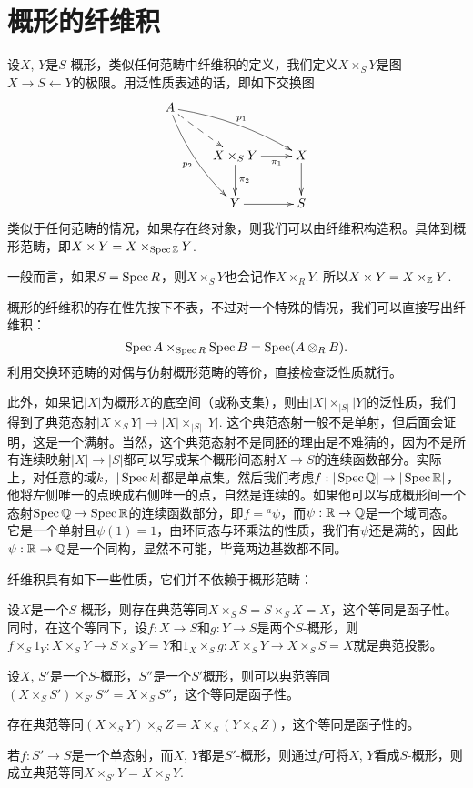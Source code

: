 \section{概形的纤维积}

\begin{para}[纤维积]
设$X$, $Y$是$S$-概形，类似任何范畴中纤维积的定义，我们定义$X\times_S Y$是图$X\to S\leftarrow Y$的极限。用泛性质表述的话，即如下交换图
\[
\begin{xy}
	\xymatrix{
		A\ar@/_/[rdd]_{p_2}\ar@/^/[drr]^{p_1}\ar@{-->}[dr]&&\\
		&X\times_S Y\ar[d]^{\pi_2}\ar[r]_-{\pi_1}&X\ar[d]\\
		&Y\ar[r]&S
	}
\end{xy}
\]
类似于任何范畴的情况，如果存在终对象，则我们可以由纤维积构造积。具体到概形范畴，即$X\times Y=X\times_{\operatorname{Spec} \mathbb{Z}} Y$.

一般而言，如果$S=\operatorname{Spec} R$，则$X\times_S Y$也会记作$X\times_R Y$. 所以$X\times Y=X\times_{\mathbb{Z}} Y$.
\end{para}

概形的纤维积的存在性先按下不表，不过对一个特殊的情况，我们可以直接写出纤维积：
\[
	\operatorname{Spec} A\times_{\operatorname{Spec} R} \operatorname{Spec} B=\operatorname{Spec}(A\otimes_R B).
\]
利用交换环范畴的对偶与仿射概形范畴的等价，直接检查泛性质就行。

此外，如果记$|X|$为概形$X$的底空间（或称支集），则由$|X|\times_{|S|}|Y|$的泛性质，我们得到了典范态射$|X\times_S Y|\to |X|\times_{|S|}|Y|$. 这个典范态射一般不是单射，但后面会证明，这是一个满射。当然，这个典范态射不是同胚的理由是不难猜的，因为不是所有连续映射$|X|\to |S|$都可以写成某个概形间态射$X\to S$的连续函数部分。实际上，对任意的域$k$，$|\operatorname{Spec} k|$都是单点集。然后我们考虑$f:|\operatorname{Spec} \mathbb{Q}|\to |\operatorname{Spec} \mathbb{R}|$，他将左侧唯一的点映成右侧唯一的点，自然是连续的。如果他可以写成概形间一个态射$\operatorname{Spec} \mathbb{Q}\to \operatorname{Spec} \mathbb{R}$的连续函数部分，即$f={}^a\psi$，而$\psi:\mathbb{R}\to \mathbb{Q}$是一个域同态。它是一个单射且$\psi(1)=1$，由环同态与环乘法的性质，我们有$\psi$还是满的，因此$\psi:\mathbb{R}\to \mathbb{Q}$是一个同构，显然不可能，毕竟两边基数都不同。

\begin{pro}\label{pro:3.2.2}
纤维积具有如下一些性质，它们并不依赖于概形范畴：
\begin{compactenum}[~~~1.]
\item 设$X$是一个$S$-概形，则存在典范等同$X\times_S S=S\times_S X=X$，这个等同是函子性。同时，在这个等同下，设$f:X\to S$和$g:Y\to S$是两个$S$-概形，则$f\times_S 1_Y:X\times_S Y\to S\times_S Y=Y$和$1_X\times_S g:X\times_S Y\to X\times_S S=X$就是典范投影。
\item 设$X$, $S'$是一个$S$-概形，$S''$是一个$S'$概形，则可以典范等同$(X\times_S S')\times_{S'}S''=X\times_S S''$，这个等同是函子性。
\item 存在典范等同$(X\times_S Y)\times_S Z=X\times_S (Y\times_S Z)$，这个等同是函子性的。
\item 若$f:S'\to S$是一个单态射，而$X$, $Y$都是$S'$-概形，则通过$f$可将$X$, $Y$看成$S$-概形，则成立典范等同$X\times_{S'}Y=X\times_S Y$.
\end{compactenum}
\end{pro}

